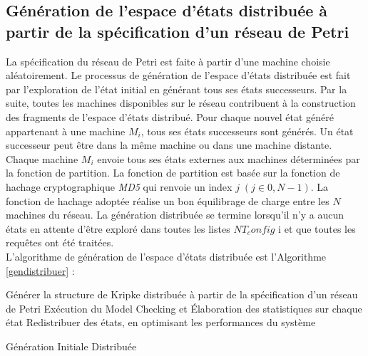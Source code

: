 \subsection{Génération de l’espace d’états distribuée à partir de la spécification d'un réseau de Petri}
La spécification du réseau de Petri est faite à partir d'une machine choisie aléatoirement. Le processus de génération de l'espace d'états distribuée est fait par l’exploration de l’état initial en générant tous ses états successeurs. Par la suite, toutes les machines disponibles sur le réseau contribuent à la construction des fragments de l’espace d’états distribué. Pour chaque nouvel état généré appartenant à une machine $M_i$, tous ses états successeurs sont générés. Un état successeur peut être dans la même machine ou dans une machine distante. Chaque machine $M_i$ envoie tous ses états externes aux machines déterminées par la fonction de partition. La fonction de partition est basée sur la fonction de hachage cryptographique \emph{MD5} qui renvoie un index $j\;(j \in 0, N-1)$. La fonction de hachage adoptée réalise un bon équilibrage de charge entre les $N$ machines du réseau.  La génération distribuée se termine lorsqu'il n'y a aucun états en attente d'être exploré dans toutes les listes $NT_config$ i et que toutes les requêtes ont été traitées.\\
L’algorithme de génération de l’espace d’états distribuée est l'Algorithme \ref{gendistribuer} :\\
\begin{algorithm}[H]\label{gendistribuer}
	\SetAlgoLined
	Générer la structure de Kripke distribuée à partir de la spécification d'un réseau de Petri\;
	Exécution du Model Checking et Élaboration des statistiques sur chaque état\;
	Redistribuer des états, en optimisant les performances du système\;	  
	\caption{Génération Initiale Distribuée}
\end{algorithm}
